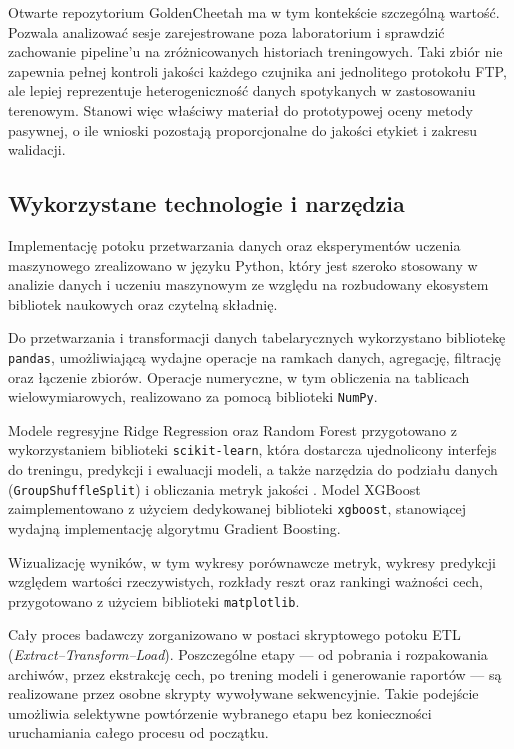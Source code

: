 Otwarte repozytorium GoldenCheetah ma w tym kontekście szczególną wartość. Pozwala analizować sesje zarejestrowane poza laboratorium i sprawdzić zachowanie pipeline'u na zróżnicowanych historiach treningowych. Taki zbiór nie zapewnia pełnej kontroli jakości każdego czujnika ani jednolitego protokołu FTP, ale lepiej reprezentuje heterogeniczność danych spotykanych w zastosowaniu terenowym. Stanowi więc właściwy materiał do prototypowej oceny metody pasywnej, o ile wnioski pozostają proporcjonalne do jakości etykiet i zakresu walidacji.

\subsection{Wykorzystane technologie i narzędzia}

Implementację potoku przetwarzania danych oraz eksperymentów uczenia maszynowego zrealizowano w języku Python, który jest szeroko stosowany w analizie danych i uczeniu maszynowym ze względu na rozbudowany ekosystem bibliotek naukowych oraz czytelną składnię.

Do przetwarzania i transformacji danych tabelarycznych wykorzystano bibliotekę \texttt{pandas}, umożliwiającą wydajne operacje na ramkach danych, agregację, filtrację oraz łączenie zbiorów. Operacje numeryczne, w tym obliczenia na tablicach wielowymiarowych, realizowano za pomocą biblioteki \texttt{NumPy}.

Modele regresyjne Ridge Regression oraz Random Forest przygotowano z wykorzystaniem biblioteki \texttt{scikit-learn}, która dostarcza ujednolicony interfejs do treningu, predykcji i ewaluacji modeli, a także narzędzia do podziału danych (\texttt{GroupShuffleSplit}) i obliczania metryk jakości \parencite{pedregosa2011scikitLearn}. Model XGBoost zaimplementowano z użyciem dedykowanej biblioteki \texttt{xgboost}, stanowiącej wydajną implementację algorytmu Gradient Boosting.

Wizualizację wyników, w tym wykresy porównawcze metryk, wykresy predykcji względem wartości rzeczywistych, rozkłady reszt oraz rankingi ważności cech, przygotowano z użyciem biblioteki \texttt{matplotlib}.

Cały proces badawczy zorganizowano w postaci skryptowego potoku ETL (\textit{Extract--Transform--Load}). Poszczególne etapy --- od pobrania i rozpakowania archiwów, przez ekstrakcję cech, po trening modeli i generowanie raportów --- są realizowane przez osobne skrypty wywoływane sekwencyjnie. Takie podejście umożliwia selektywne powtórzenie wybranego etapu bez konieczności uruchamiania całego procesu od początku.

